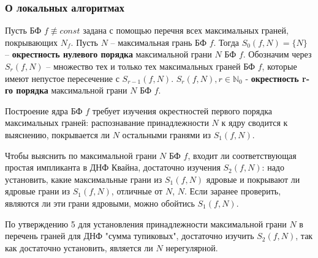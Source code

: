 \documentclass[11pt]{article}
\newcounter{th}\setcounter{th}{0}
\begin{document}
\subsubsection{О локальных алгоритмах}
\label{sec:orge4bc777}
Пусть БФ \(f \not\equiv const\) задана с помощью перечня всех максимальных граней, покрывающих
\(N_f\). Пусть \(N\) -- максимальная грань БФ \(f\). Тогда \(S_0(f, N) = \{N\}\) -- \textbf{окрестность
нулевого порядка} максимальной грани \(N\) БФ \(f\). Обозначим через \(S_r(f, N)\) -- множество тех
и только тех максимальных граней БФ \(f\), которые имеют непустое пересечение с \(S_{r - 1}(f, N)\).
\(S_r(f, N), r \in \mathbb{N}_0\) - \textbf{окрестность r-го порядка} максимальной грани \(N\) БФ \(f\).

Построение ядра БФ \(f\) требует изучения окрестностей первого порядка максимальных граней:
распознавание принадлежности \(N\) к ядру сводится к выяснению, покрывается ли \(N\) остальными
гранями из \(S_1(f, N)\).

Чтобы выяснить по максимальной грани \(N\) БФ \(f\), входит ли соответствующая простая импликанта
в ДНФ Квайна, достаточно изучения \(S_2(f, N)\): надо установить, какие максимальные грани из
\(S_1(f, N)\) ядровые и покрывают ли ядровые грани из \(S_1(f, N)\), отличные от \(N\), \(N\). Если
заранее проверить, являются ли эти грани ядровыми, можно обойтись \(S_1(f, N)\).

По утверждению 5 для установления принадлежности максимальной грани \(N\) в перечень граней для
ДНФ "сумма тупиковых", достаточно изучить \(S_2(f, N)\), так как достаточно установить, является
ли \(N\) нерегулярной.
\end{document}
